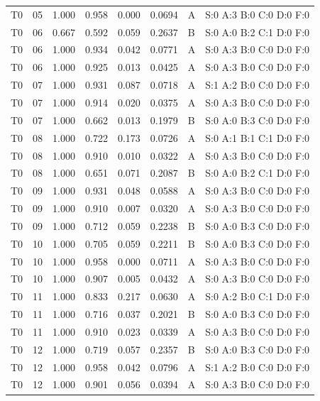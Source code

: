 \begin{longtable}{lrrrrrll}
T0 & 05 & 1.000 & 0.958 & 0.000 & 0.0694 & A & \tiny S:0 A:3 B:0 C:0 D:0 F:0 \\
T0 & 06 & 0.667 & 0.592 & 0.059 & 0.2637 & B & \tiny S:0 A:0 B:2 C:1 D:0 F:0 \\
T0 & 06 & 1.000 & 0.934 & 0.042 & 0.0771 & A & \tiny S:0 A:3 B:0 C:0 D:0 F:0 \\
T0 & 06 & 1.000 & 0.925 & 0.013 & 0.0425 & A & \tiny S:0 A:3 B:0 C:0 D:0 F:0 \\
T0 & 07 & 1.000 & 0.931 & 0.087 & 0.0718 & A & \tiny S:1 A:2 B:0 C:0 D:0 F:0 \\
T0 & 07 & 1.000 & 0.914 & 0.020 & 0.0375 & A & \tiny S:0 A:3 B:0 C:0 D:0 F:0 \\
T0 & 07 & 1.000 & 0.662 & 0.013 & 0.1979 & B & \tiny S:0 A:0 B:3 C:0 D:0 F:0 \\
T0 & 08 & 1.000 & 0.722 & 0.173 & 0.0726 & A & \tiny S:0 A:1 B:1 C:1 D:0 F:0 \\
T0 & 08 & 1.000 & 0.910 & 0.010 & 0.0322 & A & \tiny S:0 A:3 B:0 C:0 D:0 F:0 \\
T0 & 08 & 1.000 & 0.651 & 0.071 & 0.2087 & B & \tiny S:0 A:0 B:2 C:1 D:0 F:0 \\
T0 & 09 & 1.000 & 0.931 & 0.048 & 0.0588 & A & \tiny S:0 A:3 B:0 C:0 D:0 F:0 \\
T0 & 09 & 1.000 & 0.910 & 0.007 & 0.0320 & A & \tiny S:0 A:3 B:0 C:0 D:0 F:0 \\
T0 & 09 & 1.000 & 0.712 & 0.059 & 0.2238 & B & \tiny S:0 A:0 B:3 C:0 D:0 F:0 \\
T0 & 10 & 1.000 & 0.705 & 0.059 & 0.2211 & B & \tiny S:0 A:0 B:3 C:0 D:0 F:0 \\
T0 & 10 & 1.000 & 0.958 & 0.000 & 0.0711 & A & \tiny S:0 A:3 B:0 C:0 D:0 F:0 \\
T0 & 10 & 1.000 & 0.907 & 0.005 & 0.0432 & A & \tiny S:0 A:3 B:0 C:0 D:0 F:0 \\
T0 & 11 & 1.000 & 0.833 & 0.217 & 0.0630 & A & \tiny S:0 A:2 B:0 C:1 D:0 F:0 \\
T0 & 11 & 1.000 & 0.716 & 0.037 & 0.2021 & B & \tiny S:0 A:0 B:3 C:0 D:0 F:0 \\
T0 & 11 & 1.000 & 0.910 & 0.023 & 0.0339 & A & \tiny S:0 A:3 B:0 C:0 D:0 F:0 \\
T0 & 12 & 1.000 & 0.719 & 0.057 & 0.2357 & B & \tiny S:0 A:0 B:3 C:0 D:0 F:0 \\
T0 & 12 & 1.000 & 0.958 & 0.042 & 0.0796 & A & \tiny S:1 A:2 B:0 C:0 D:0 F:0 \\
T0 & 12 & 1.000 & 0.901 & 0.056 & 0.0394 & A & \tiny S:0 A:3 B:0 C:0 D:0 F:0 \\

\end{longtable}
